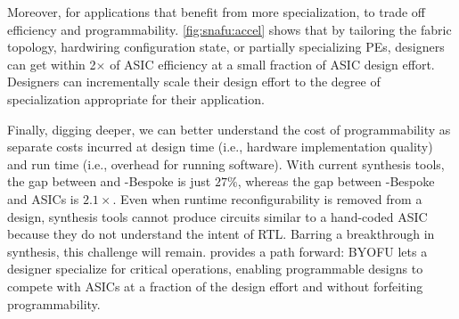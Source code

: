 Moreover, for applications that benefit from more specialization, 
to trade off efficiency and programmability.
%
\autoref{fig:snafu:accel} shows that by tailoring the fabric topology,
hardwiring configuration state,
or partially specializing PEs,
designers can get within 2$\times$ of ASIC efficiency
at a small fraction of ASIC design effort.
%
Designers can incrementally scale their design effort
to the degree of specialization appropriate for their application.

Finally, digging deeper, we can better understand the cost of programmability as separate
%
costs incurred at design time (i.e., hardware implementation quality)
and run time (i.e., overhead for running software).
%
With current synthesis tools,
%
the gap between \snafu and {\sc \snafu-Bespoke} is just $27\%$,
%
whereas the gap between {\sc \snafu-Bespoke} and ASICs is $2.1\times$.
% 
Even when runtime reconfigurability is removed from a design,
synthesis tools cannot produce circuits similar to a hand-coded ASIC
because they do not understand the intent of RTL.
%
Barring a breakthrough in synthesis, this challenge will remain. 
% 
\snafu provides a path forward:
% 
{\sc BYOFU} lets a designer specialize for critical operations,
enabling programmable designs to compete with ASICs at a fraction of the design effort
and without forfeiting programmability.
